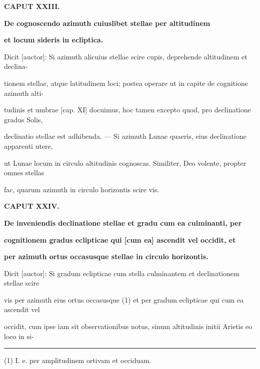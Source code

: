 \documentclass[11pt]{article}
\begin{document}
\hypertarget{AB01-PDF0124-body-L022}{}\begin{center}\bfseries CAPUT XXIII.\end{center}
\hypertarget{AB01-PDF0124-body-L023}{}\begin{center}\bfseries De cognoscendo azimuth cuiuslibet stellae per altitudinem\end{center}
\hypertarget{AB01-PDF0124-body-L024}{}\begin{center}\bfseries et locum sideris in ecliptica.\end{center}
\noindent\hypertarget{AB01-PDF0124-body-L025}{}Dicit [auctor]: Si azimuth alicuius stellae scire cupis, deprehende altitudinem et declina-\strut\par
\noindent\hypertarget{AB01-PDF0124-body-L026}{}tionem stellae, atque latitudinem loci; postea operare ut in capite de cognitione azimuth alti-\strut\par
\noindent\hypertarget{AB01-PDF0124-body-L027}{}tudinis et umbrae [cap. XI] docuimus, hoc tamen excepto quod, pro declinatione gradus Solis,\strut\par
\noindent\hypertarget{AB01-PDF0124-body-L028}{}declinatio stellae est adhibenda. — Si azimuth Lunae quaeris, eius declinatione apparenti utere,\strut\par
\noindent\hypertarget{AB01-PDF0124-body-L029}{}ut Lunae locum in circulo altitudinis cognoscas. Similiter, Deo volente, propter omnes stellas\strut\par
\noindent\hypertarget{AB01-PDF0124-body-L030}{}fac, quarum azimuth in circulo horizontis scire vis.\strut\par
\hypertarget{AB01-PDF0124-body-L031}{}\begin{center}\bfseries CAPUT XXIV.\end{center}
\hypertarget{AB01-PDF0124-body-L032}{}\begin{center}\bfseries De inveniendis declinatione stellae et gradu cum ea culminanti, per\end{center}
\hypertarget{AB01-PDF0124-body-L033}{}\begin{center}\bfseries cognitionem gradus eclipticae qui [cum ea] ascendit vel occidit, et\end{center}
\hypertarget{AB01-PDF0124-body-L034}{}\begin{center}\bfseries per azimuth ortus occasusque stellae in circulo horizontis.\end{center}
\noindent\hypertarget{AB01-PDF0124-body-L035}{}Dicit [auctor]: Si gradum eclipticae cum stella culminantem et declinationem stellae scire\strut\par
\noindent\hypertarget{AB01-PDF0124-body-L036}{}vis per azimuth eius ortus occasusque (1) et per gradum eclipticae qui cum ea ascendit vel\strut\par
\noindent\hypertarget{AB01-PDF0124-body-L037}{}occidit, cum ipse iam sit observationibus notus, sinum altitudinis initii Arietis eo loco in si-\strut\par
\vspace{5mm}\hrule\vspace{2mm}
{\fontsize{9.2}{11.2}\selectfont
\noindent\hypertarget{AB01-PDF0124-notes_full-L001}{}(1) I. e. per amplitudinem ortivam et occiduam.\strut\par
}
\end{document}
